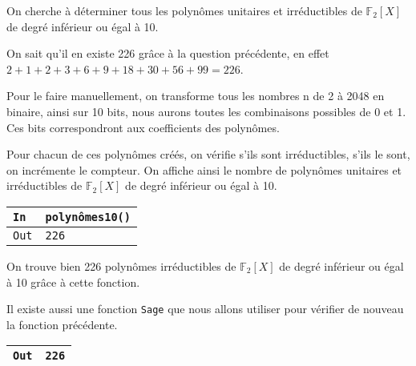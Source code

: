 \documentclass[titlepage]{article}
\begin{document}
            On cherche à déterminer tous les polynômes unitaires et irréductibles de $\mathbb{F}_2[X]$ de degré inférieur ou égal à 10.\newline
            
            On sait qu'il en existe 226 grâce à la question précédente, en effet $2 + 1 + 2 + 3 + 6 + 9 + 18 + 30 + 56 + 99 = 226$. \newline

            Pour le faire manuellement, on transforme tous les nombres n de 2 à 2048 en binaire, ainsi sur 10 bits,
            nous aurons toutes les combinaisons possibles de 0 et 1. Ces bits correspondront aux coefficients des polynômes. \newline
            
            Pour chacun de ces polynômes créés, on vérifie s'ils sont irréductibles, s'ils le sont, on incrémente le compteur. \newline
            On affiche ainsi le nombre de polynômes unitaires et irréductibles de $\mathbb{F}_2[X]$ de degré inférieur ou égal à 10. \newline

            

            \begin{tabularx}{12cm}{|p{0.60cm}|X|}
                \hline
                \rowcolor{gray}
                \texttt{In}
                & 
                \texttt{polynômes10()}
                \\
                \hline
                \texttt{Out}
                &
                \texttt{226}
                \\
                \hline
            \end{tabularx}
            \bigbreak

            On trouve bien 226 polynômes irréductibles de $\mathbb{F}_2[X]$ de degré inférieur ou égal à 10 grâce à cette fonction.

            Il existe aussi une fonction \texttt{Sage} que nous allons utiliser pour vérifier de nouveau la fonction précédente.

            

            \begin{tabularx}{12cm}{|p{0.60cm}|X|}
                \hline
                \texttt{Out}
                &
                \texttt{226}
                \\
                \hline
            \end{tabularx}
            \bigbreak
    
\end{document}
